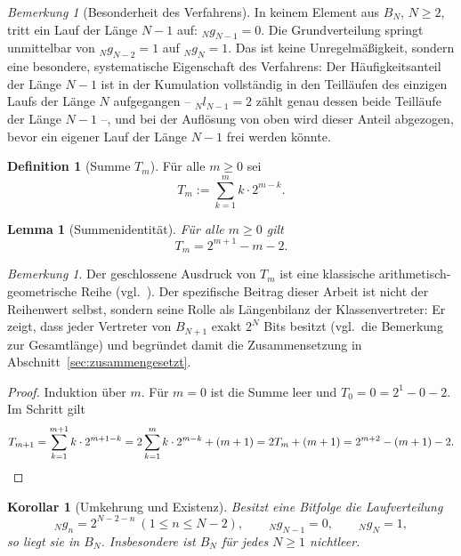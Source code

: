 \documentclass[11pt,a4paper]{scrartcl}
\theoremstyle{plain}
\newtheorem{lemma}[satz]{Lemma}
\newtheorem{korollar}[satz]{Korollar}
\theoremstyle{definition}
\newtheorem{defi}[satz]{Definition}
\theoremstyle{remark}
\newtheorem{bem}[satz]{Bemerkung}
\begin{document}
\begin{bem}[Besonderheit des Verfahrens]\label{bem:keinlaufnminus1}
In keinem Element aus $B_N$, $N\geq 2$, tritt ein Lauf der Länge $N-1$
auf: $_Ng_{N-1}=0$. Die Grundverteilung springt unmittelbar von
$_Ng_{N-2}=1$ auf $_Ng_N=1$. Das ist keine Unregelmäßigkeit, sondern
eine besondere, systematische Eigenschaft des Verfahrens: Der
Häufigkeitsanteil der Länge $N-1$ ist in der Kumulation vollständig in
den Teilläufen des einzigen Laufs der Länge $N$ aufgegangen --
$_Nl_{N-1}=2$ zählt genau dessen beide Teilläufe der Länge $N-1$ --,
und bei der Auflösung von oben wird dieser Anteil abgezogen, bevor ein
eigener Lauf der Länge $N-1$ frei werden könnte.
\end{bem}

\begin{defi}[Summe $T_m$]\label{defi:summenidentitaet}
Für alle $m\geq 0$ sei
\begin{equation}\label{eqn:summenidentitaet}
  T_m:=\sum_{k=1}^{m} k\cdot 2^{m-k}.
\end{equation}
\end{defi}

\begin{lemma}[Summenidentität]\label{lem:summenidentitaet}
Für alle $m\geq 0$ gilt
\begin{equation}\label{eqn:summenwert}
  T_m=2^{m+1}-m-2.
\end{equation}
\end{lemma}

\begin{bem}
Der geschlossene Ausdruck von $T_m$ ist eine klassische
arithmetisch-geometrische Reihe (vgl.~\cite{knuth1997}). Der
spezifische Beitrag dieser Arbeit ist nicht der Reihenwert selbst,
sondern seine Rolle als Längenbilanz der Klassenvertreter: Er zeigt,
dass jeder Vertreter von $B_{N+1}$ exakt $2^{N}$ Bits besitzt
(vgl.~die Bemerkung zur Gesamtlänge) und begründet damit die
Zusammensetzung in Abschnitt~\ref{sec:zusammengesetzt}.
\end{bem}

\begin{proof}
Induktion über $m$. Für $m=0$ ist die Summe leer und
$T_0=0=2^{1}-0-2$. Im Schritt gilt
\begin{equation*}
  T_{m+1}=\sum_{k=1}^{m+1}k\cdot 2^{m+1-k}
  =2\sum_{k=1}^{m}k\cdot 2^{m-k}+(m+1)
  =2T_m+(m+1)
  =2^{m+2}-(m+1)-2.\qedhere
\end{equation*}
\end{proof}

\begin{korollar}[Umkehrung und Existenz]\label{kor:umkehrung}
Besitzt eine Bitfolge die Laufverteilung
\begin{equation}\label{eqn:grundform}
  _Ng_n=2^{N-2-n}\ (1\leq n\leq N-2),\qquad _Ng_{N-1}=0,\qquad _Ng_N=1,
\end{equation}
so liegt sie in $B_N$. Insbesondere ist $B_N$ für jedes $N\geq 1$
nichtleer.
\end{korollar}
\end{document}
